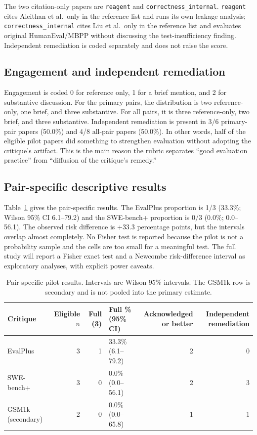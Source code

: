 \documentclass[11pt,a4paper]{article}
\newcommand{\key}[1]{\texttt{\small #1}}
\begin{document}
The two citation-only papers are \key{reagent} and \key{correctness\_internal}. \key{reagent} cites Aleithan et al.\ only in the reference list and runs its own leakage analysis; \key{correctness\_internal} cites Liu et al.\ only in the reference list and evaluates original HumanEval/MBPP without discussing the test-insufficiency finding. Independent remediation is coded separately and does not raise the score.

\subsection{Engagement and independent remediation}

Engagement is coded 0 for reference only, 1 for a brief mention, and 2 for substantive discussion. For the primary pairs, the distribution is two reference-only, one brief, and three substantive. For all pairs, it is three reference-only, two brief, and three substantive. Independent remediation is present in 3/6 primary-pair papers (50.0\%) and 4/8 all-pair papers (50.0\%). In other words, half of the eligible pilot papers did something to strengthen evaluation without adopting the critique's artifact. This is the main reason the rubric separates ``good evaluation practice'' from ``diffusion of the critique's remedy.''

\subsection{Pair-specific descriptive results}

Table~\ref{tab:pair} gives the pair-specific results. The EvalPlus proportion is 1/3 (33.3\%; Wilson 95\% CI 6.1--79.2) and the SWE-bench+ proportion is 0/3 (0.0\%; 0.0--56.1). The observed risk difference is +33.3 percentage points, but the intervals overlap almost completely. No Fisher test is reported because the pilot is not a probability sample and the cells are too small for a meaningful test. The full study will report a Fisher exact test and a Newcombe risk-difference interval as exploratory analyses, with explicit power caveats.

\begin{table}[t]
\centering
\caption{Pair-specific pilot results. Intervals are Wilson 95\% intervals. The GSM1k row is secondary and is not pooled into the primary estimate.}
\label{tab:pair}
\footnotesize
\begin{tabular}{@{}l r r l r r@{}}
\toprule
Critique & Eligible $n$ & Full (3) & Full \% (95\% CI) & Acknowledged or better & Independent remediation \\
\midrule
EvalPlus & 3 & 1 & 33.3\% (6.1--79.2) & 2 & 0 \\
SWE-bench+ & 3 & 0 & 0.0\% (0.0--56.1) & 2 & 3 \\
GSM1k (secondary) & 2 & 0 & 0.0\% (0.0--65.8) & 1 & 1 \\
\bottomrule
\end{tabular}
\end{table}
\end{document}
